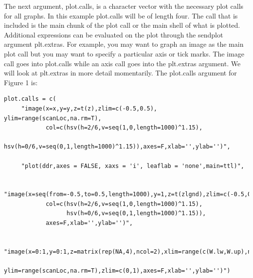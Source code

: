 \documentclass[]{article}
\begin{document}
\quad The next argument, plot.calls, is a character vector with the necessary plot calls for all graphs. In this example plot.calls will be of length four. The call that is included is the main chunk of the plot call or the main shell of what is plotted. Additional expressions can be evaluated on the plot through the sendplot argument plt.extras. For example, you may want to graph an image as the main plot call but you may want to specify a particular axis or tick marks. The image call goes into plot.calls while an axis call goes into the plt.extras argument. We will look at plt.extras in more detail momentarily. The plot.calls argument for Figure 1 is:

\begin{verbatim}
plot.calls = c(
     "image(x=x,y=y,z=t(z),zlim=c(-0.5,0.5), ylim=range(scanLoc,na.rm=T),
            col=c(hsv(h=2/6,v=seq(1,0,length=1000)^1.15),
            hsv(h=0/6,v=seq(0,1,length=1000)^1.15)),axes=F,xlab='',ylab='')",

     "plot(ddr,axes = FALSE, xaxs = 'i', leaflab = 'none',main=ttl)",

     "image(x=seq(from=-0.5,to=0.5,length=1000),y=1,z=t(zlgnd),zlim=c(-0.5,0.5),
            col=c(hsv(h=2/6,v=seq(1,0,length=1000)^1.15),
                  hsv(h=0/6,v=seq(0,1,length=1000)^1.15)),
            axes=F,xlab='',ylab='')",

     "image(x=0:1,y=0:1,z=matrix(rep(NA,4),ncol=2),xlim=range(c(W.lw,W.up),na.rm=T),
            ylim=range(scanLoc,na.rm=T),zlim=c(0,1),axes=F,xlab='',ylab='')")

\end{verbatim}
\end{document}
